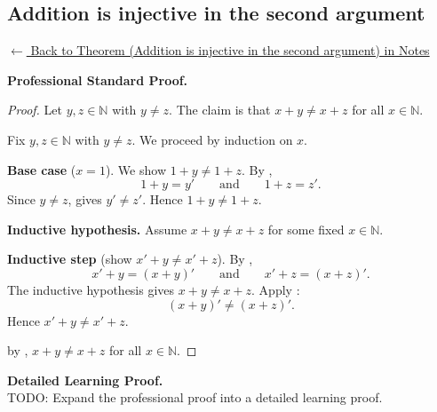 
\subsection*{Addition is injective in the second argument}
\label{prf:landau-thm8-add-injective}

\begin{remark*}[Return]
\hyperref[thm:landau-thm8-add-injective]{$\leftarrow$ Back to Theorem
(Addition is injective in the second argument) in Notes}
\end{remark*}

\textbf{Professional Standard Proof.}~\\
\begin{proof}
\Claim Let $y, z \in \mathbb{N}$ with $y \neq z$.
The claim is that $x + y \neq x + z$ for all $x \in \mathbb{N}$.

Fix $y, z \in \mathbb{N}$ with $y \neq z$.
We proceed by induction on $x$.

\textbf{Base case} ($x = 1$).
We show $1 + y \neq 1 + z$.
By ,
\[
  1 + y = y' \qquad \text{and} \qquad 1 + z = z'.
\]
Since $y \neq z$, 
gives $y' \neq z'$.
Hence $1 + y \neq 1 + z$. \checkbox

\textbf{Inductive hypothesis.}
Assume $x + y \neq x + z$ for some fixed $x \in \mathbb{N}$.

\textbf{Inductive step} (show $x' + y \neq x' + z$).
By ,
\[
  x' + y = (x + y)' \qquad \text{and} \qquad x' + z = (x + z)'.
\]
The inductive hypothesis gives $x + y \neq x + z$.
Apply :
\[
  (x + y)' \neq (x + z)'.
\]
Hence $x' + y \neq x' + z$.

\Hence by , $x + y \neq x + z$ for all
$x \in \mathbb{N}$. \AsReq
\end{proof}

\textbf{Detailed Learning Proof.}~\\
TODO: Expand the professional proof into a detailed learning proof.



